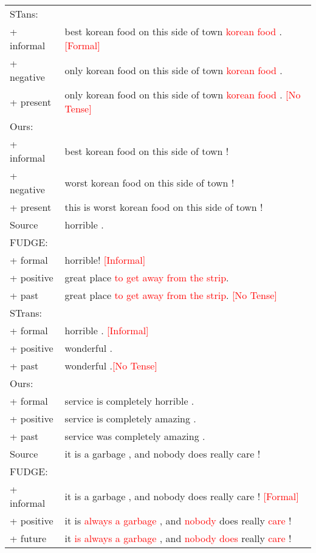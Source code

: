 \documentclass[11pt]{article}
\newcommand{\senc}[1]{\textcolor{red}{#1}}
\begin{document}
\begin{table}[ht]
\begin{tabular}{ll}
          STans:&\\
         + informal&best korean food on this side of town \senc{korean food} . \senc{[Formal]}\\
         \quad+ negative&only korean food on this side of town \senc{korean food} .\\
         \quad\quad+ present&only korean food on this side of town \senc{korean food} . \senc{[No Tense]}\\
          Ours:& \\
          + informal&best korean food on this side of town ! \\
         \quad + negative& worst korean food on this side of town ! \\
          \quad\quad+ present& this is worst korean food on this side of town !\\\midrule
         Source & horrible . \\\midrule
          FUDGE:& \\
          + formal&horrible! \senc{[Informal]}\\
          \quad+ positive&great place \senc{to get away from the strip}.\\
          \quad\quad+ past&great place \senc{to get away from the strip}. \senc{[No Tense]}\\
          STrans:& \\
          + formal&horrible . \senc{[Informal]}\\
          \quad+ positive&wonderful .\\
          \quad\quad+ past& wonderful .\senc{[No Tense]}\\
           Ours:&\\
          + formal&service is completely horrible . \\
          \quad+ positive&service is completely amazing .\\
          \quad\quad+ past& service was completely amazing .\\\midrule
         Source & it is a garbage , and nobody does really care !\\\midrule
         FUDGE:& \\
          + informal &it is a garbage , and nobody does really care ! \senc{[Formal]} \\
          \quad+ positive &it is \senc{always a garbage} , and \senc{nobody} does really \senc{care} !\\
          \quad\quad+ future &it \senc{is always a garbage} , and \senc{nobody does} really \senc{care} !\\

\end{tabular}
\end{table}
\end{document}
